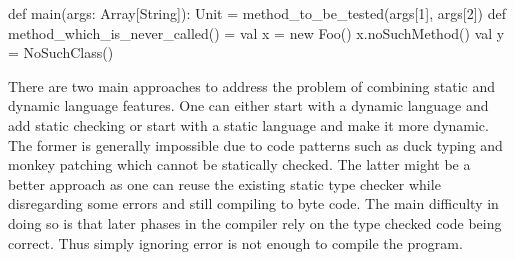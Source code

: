 
\begin{lstlisting-nobreak}
def main(args: Array[String]): Unit = {
    method_to_be_tested(args[1], args[2])
}
def method_which_is_never_called() = {
    val x = new Foo()
    x.noSuchMethod()
    val y = NoSuchClass()
}
\end{lstlisting-nobreak}

  There are two main approaches to address the problem of combining static and dynamic language features. One can either start with a dynamic language and add static checking or start with a static language and make it more dynamic. The former is generally impossible due to code patterns such as duck typing and monkey patching which cannot be statically checked. The latter might be a better approach as one can reuse the existing static type checker while disregarding some errors and still compiling to byte code. The main difficulty in doing so is that later phases in the compiler rely on the type checked code being correct. Thus simply ignoring error is not enough to compile the program.


